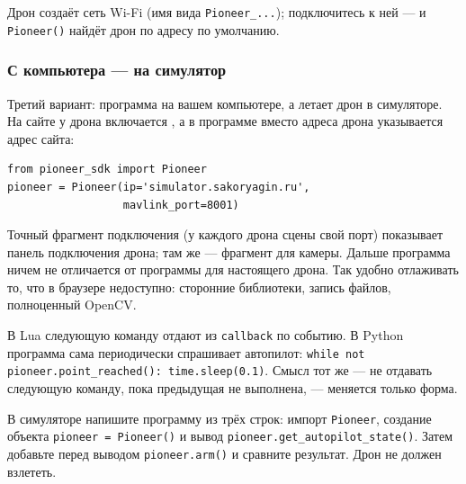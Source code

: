 Дрон создаёт сеть Wi-Fi (имя вида \texttt{Pioneer\_...}); подключитесь к ней --- и \verb|Pioneer()| найдёт дрон по адресу по умолчанию.

\subsubsection*{С компьютера --- на симулятор}
\label{sec:python-external}

Третий вариант: программа на вашем компьютере, а летает дрон в симуляторе. На сайте у дрона включается , а в программе вместо адреса дрона указывается адрес сайта:

\begin{codebox}
\begin{verbatim}
from pioneer_sdk import Pioneer
pioneer = Pioneer(ip='simulator.sakoryagin.ru',
                  mavlink_port=8001)
\end{verbatim}
\end{codebox}

Точный фрагмент подключения (у каждого дрона сцены свой порт) показывает панель подключения дрона; там же --- фрагмент для камеры. Дальше программа ничем не отличается от программы для настоящего дрона. Так удобно отлаживать то, что в браузере недоступно: сторонние библиотеки, запись файлов, полноценный OpenCV.

\begin{infobox}
В Lua следующую команду отдают из \verb|callback| по событию. В Python программа сама периодически спрашивает автопилот: \verb|while not pioneer.point_reached(): time.sleep(0.1)|. Смысл тот же --- не отдавать следующую команду, пока предыдущая не выполнена, --- меняется только форма.
\end{infobox}

\begin{taskbox}
В симуляторе напишите программу из трёх строк: импорт \verb|Pioneer|, создание объекта \verb|pioneer = Pioneer()| и вывод \verb|pioneer.get_autopilot_state()|. Затем добавьте перед выводом \verb|pioneer.arm()| и сравните результат. Дрон не должен взлететь.
\end{taskbox}
